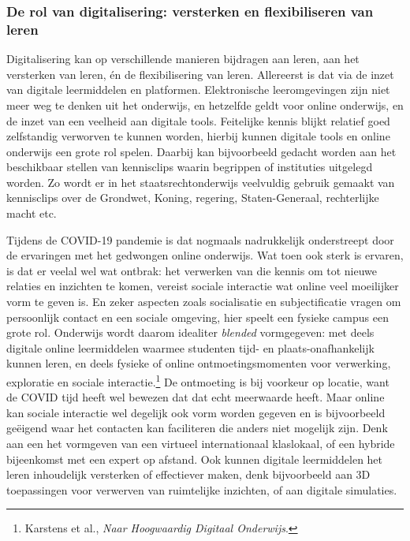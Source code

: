 \documentclass[smallauthor, chapterhaspagenum, nochapterinheader, pagenuminheader,  bigchapnum,medium2, tocpages, garamond, titleinheader]{jote-book}
\begin{document}
	\subsubsection{De rol van digitalisering: versterken en flexibiliseren van leren}



	Digitalisering kan op verschillende manieren bijdragen aan leren, aan het versterken van leren, én de flexibilisering van leren. Allereerst is dat via de inzet van digitale leermiddelen en platformen. Elektronische leeromgevingen zijn niet meer weg te denken uit het onderwijs, en hetzelfde geldt voor online onderwijs, en de inzet van een veelheid aan digitale tools. Feitelijke kennis blijkt relatief goed zelfstandig verworven te kunnen worden, hierbij kunnen digitale tools en online onderwijs een grote rol spelen. Daarbij kan bijvoorbeeld gedacht worden aan het beschikbaar stellen van kennisclips waarin begrippen of instituties uitgelegd worden. Zo wordt er in het staatsrechtonderwijs veelvuldig gebruik gemaakt van kennisclips over de Grondwet, Koning, regering, Staten-Generaal, rechterlijke macht etc.



	Tijdens de COVID-19 pandemie is dat nogmaals nadrukkelijk onderstreept door de ervaringen met het gedwongen online onderwijs. Wat toen ook sterk is ervaren, is dat er veelal wel wat ontbrak: het verwerken van die kennis om tot nieuwe relaties en inzichten te komen, vereist sociale interactie wat online veel moeilijker vorm te geven is. En zeker aspecten zoals socialisatie en subjectificatie vragen om persoonlijk contact en een sociale omgeving, hier speelt een fysieke campus een grote rol. Onderwijs wordt daarom idealiter \emph{blended} vormgegeven: met deels digitale online leermiddelen waarmee studenten tijd- en plaats-onafhankelijk kunnen leren, en deels fysieke of online ontmoetingsmomenten voor verwerking, exploratie en sociale interactie.\footnote{Karstens et al., \emph{Naar Hoogwaardig Digitaal Onderwijs}.} De ontmoeting is bij voorkeur op locatie, want de COVID tijd heeft wel bewezen dat dat echt meerwaarde heeft. Maar online kan sociale interactie wel degelijk ook vorm worden gegeven en is bijvoorbeeld geëigend waar het contacten kan faciliteren die anders niet mogelijk zijn. Denk aan een het vormgeven van een virtueel internationaal klaslokaal, of een hybride bijeenkomst met een expert op afstand. Ook kunnen digitale leermiddelen het leren inhoudelijk versterken of effectiever maken, denk bijvoorbeeld aan 3D toepassingen voor verwerven van ruimtelijke inzichten, of aan digitale simulaties.
\end{document}
